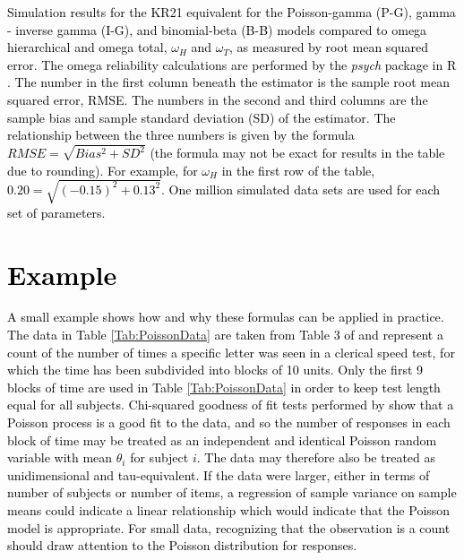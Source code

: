 \documentclass[12pt,epsfig]{article}
\newcommand{\changed}[1]{\textcolor{black}{#1}}
\begin{document}
\begin{table} [h]
\caption{\changed{Simulation results for the  KR21 equivalent for the Poisson-gamma (P-G), gamma -  inverse gamma (I-G), and binomial-beta (B-B) models compared to omega hierarchical and omega total, $\omega_H$ and $\omega_{T}$, as measured by root mean squared error. The omega reliability calculations are performed by the \emph{psych} package in R \citep{PsychPackage}. The number in the first column beneath the estimator is the sample root mean squared error, RMSE. The numbers in the second and third columns are the sample bias and sample standard deviation (SD) of the estimator. The relationship between the three numbers is given by the formula $RMSE = \sqrt{Bias^2 + SD^2}$ (the formula may not be exact for results in the table due to rounding). For example, for $\omega_H$ in the first row of the table, $0.20 = \sqrt{(-0.15)^2 + 0.13^2}$. One million simulated data sets are used for each set of parameters.  }}

\label{Tab:OmegaSimulationStudy}
\end{table}

\section{\changed{Example}}

\changed{A small example shows how and why these formulas can be applied in practice. The data in Table \ref{Tab:PoissonData} are taken from Table 3 of \cite{Moore1970} and represent a count of the number of times a specific letter was seen in a clerical speed test, for which the time has been subdivided into blocks of 10 units. Only the first 9 blocks of time are used in Table \ref{Tab:PoissonData} in order to keep test length equal for all subjects. Chi-squared goodness of fit tests performed by \cite{Moore1970} show that a Poisson process is a good fit to the data, and so the number of responses in each block of time may be treated as an independent and identical Poisson random variable with mean $\theta_i$ for subject $i$. The data may therefore also be treated as unidimensional and tau-equivalent. If the data were larger, either in terms of number of subjects or number of items, a regression of sample variance on sample means could indicate a linear relationship which would indicate that the Poisson model is appropriate. For small data, recognizing that the observation is a count should draw attention to the Poisson distribution for responses.}
\end{document}

